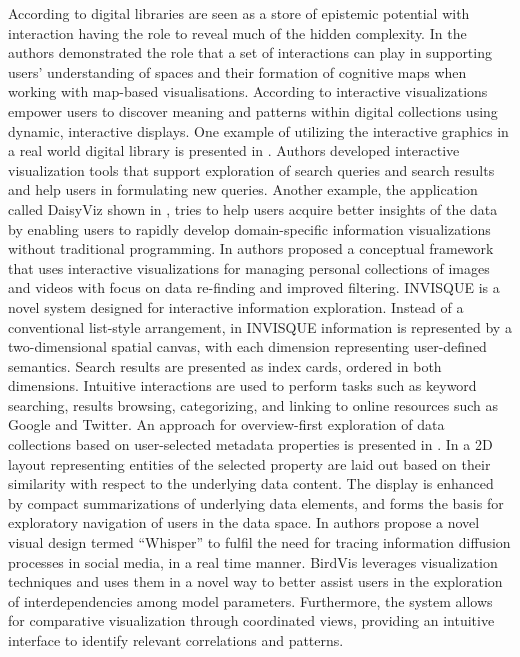 \documentclass[amsthm,ebook]{saparticle}
\begin{document}
According to \citet{fast_interaction_2010} digital libraries are seen as a store of epistemic potential with interaction having
the role to reveal much of the hidden complexity. In \citet{buchel_making_2014} the authors demonstrated the role that a
set of interactions can play in supporting users' understanding of spaces and their formation of cognitive maps when
working with map-based visualisations. According to \citet{algee_viewshare_2012} interactive visualizations empower users to
discover meaning and patterns within digital collections using dynamic, interactive displays. One example of utilizing
the interactive graphics in a real world digital library is presented in \citet{hienert_integrating_2012}. Authors developed
interactive visualization tools that support exploration of search queries and search results and help users in
formulating new queries. Another example, the application called DaisyViz shown in \citet{ren_daisyviz:_2010}, tries to help
users acquire better insights of the data by enabling users to rapidly develop domain-specific information
visualizations without traditional programming. In \citet{nasar_conceptual_2011} authors proposed a conceptual framework that
uses interactive visualizations for managing personal collections of images and videos with focus on data re-finding
and improved filtering. INVISQUE \citep{wong_invisque:_2011} is a novel system designed for interactive information
exploration. Instead of a conventional list-style arrangement, in INVISQUE information is represented by a
two-dimensional spatial canvas, with each dimension representing user-defined semantics. Search results are presented
as index cards, ordered in both dimensions. Intuitive interactions are used to perform tasks such as keyword searching,
results browsing, categorizing, and linking to online resources such as Google and Twitter. An approach for
overview-first exploration of data collections based on user-selected metadata properties is presented in \citet{bernard_content-based_2012}. In a 2D layout representing entities of the selected property are laid out based on their similarity with
respect to the underlying data content. The display is enhanced by compact summarizations of underlying data elements,
and forms the basis for exploratory navigation of users in the data space. In \citet{cao_whisper:_2012} authors propose a
novel visual design termed ``Whisper'' to fulfil the need for tracing information diffusion processes in social media, in
a real time manner. BirdVis \citep{ferreira_birdvis:_2011} leverages visualization techniques and uses them in a novel way to
better assist users in the exploration of interdependencies among model parameters. Furthermore, the system allows for
comparative visualization through coordinated views, providing an intuitive interface to identify relevant correlations
and patterns. 
\end{document}
